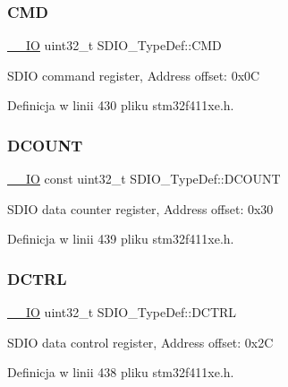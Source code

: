 \subsubsection{\texorpdfstring{C\+MD}{CMD}}
{\footnotesize\ttfamily \hyperlink{core__sc300_8h_aec43007d9998a0a0e01faede4133d6be}{\+\_\+\+\_\+\+IO} uint32\+\_\+t S\+D\+I\+O\+\_\+\+Type\+Def\+::\+C\+MD}

S\+D\+IO command register, Address offset\+: 0x0C 

Definicja w linii 430 pliku stm32f411xe.\+h.

\mbox{\label{struct_s_d_i_o___type_def_a9055054e38631b8834a95730a2b1b1b9}} 
\subsubsection{\texorpdfstring{D\+C\+O\+U\+NT}{DCOUNT}}
{\footnotesize\ttfamily \hyperlink{core__sc300_8h_aec43007d9998a0a0e01faede4133d6be}{\+\_\+\+\_\+\+IO} const uint32\+\_\+t S\+D\+I\+O\+\_\+\+Type\+Def\+::\+D\+C\+O\+U\+NT}

S\+D\+IO data counter register, Address offset\+: 0x30 

Definicja w linii 439 pliku stm32f411xe.\+h.

\mbox{\label{struct_s_d_i_o___type_def_a801519a7af801ad43b88007bf4e2e906}} 
\subsubsection{\texorpdfstring{D\+C\+T\+RL}{DCTRL}}
{\footnotesize\ttfamily \hyperlink{core__sc300_8h_aec43007d9998a0a0e01faede4133d6be}{\+\_\+\+\_\+\+IO} uint32\+\_\+t S\+D\+I\+O\+\_\+\+Type\+Def\+::\+D\+C\+T\+RL}

S\+D\+IO data control register, Address offset\+: 0x2C 

Definicja w linii 438 pliku stm32f411xe.\+h.

\mbox{\label{struct_s_d_i_o___type_def_aa98ab507ed05468ca4baccd1731231cd}} 
